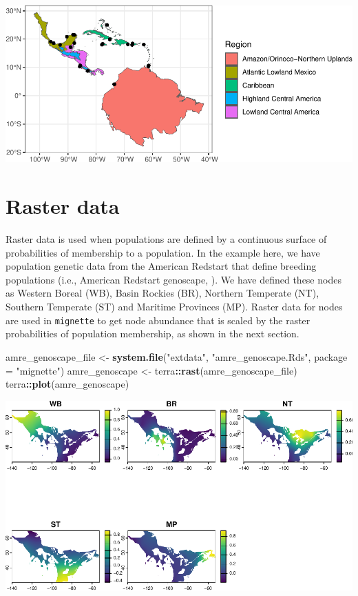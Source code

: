 \documentclass[
]{book}
\newenvironment{Shaded}{\begin{snugshade}}{\end{snugshade}}
\newcommand{\AttributeTok}[1]{\textcolor[rgb]{0.13,0.29,0.53}{#1}}
\newcommand{\FunctionTok}[1]{\textcolor[rgb]{0.13,0.29,0.53}{\textbf{#1}}}
\newcommand{\NormalTok}[1]{#1}
\newcommand{\OtherTok}[1]{\textcolor[rgb]{0.56,0.35,0.01}{#1}}
\newcommand{\SpecialCharTok}[1]{\textcolor[rgb]{0.81,0.36,0.00}{\textbf{#1}}}
\newcommand{\StringTok}[1]{\textcolor[rgb]{0.31,0.60,0.02}{#1}}
\begin{document}
\includegraphics{Mignette_files/figure-latex/unnamed-chunk-14-1.pdf}

\hypertarget{raster-data}{%
\section{Raster data}\label{raster-data}}

Raster data is used when populations are defined by a continuous surface of probabilities of membership to a population. In the example here, we have population genetic data from the American Redstart that define breeding populations (i.e., American Redstart genoscape, \citep{desaix2023low}). We have defined these nodes as Western Boreal (WB), Basin Rockies (BR), Northern Temperate (NT), Southern Temperate (ST) and Maritime Provinces (MP). Raster data for nodes are used in \texttt{mignette} to get node abundance that is scaled by the raster probabilities of population membership, as shown in the next section.

\begin{Shaded}
\begin{Highlighting}[]
\NormalTok{amre\_genoscape\_file }\OtherTok{\textless{}{-}} \FunctionTok{system.file}\NormalTok{(}\StringTok{"extdata"}\NormalTok{, }\StringTok{"amre\_genoscape.Rds"}\NormalTok{, }\AttributeTok{package =} \StringTok{"mignette"}\NormalTok{)}
\NormalTok{amre\_genoscape }\OtherTok{\textless{}{-}}\NormalTok{ terra}\SpecialCharTok{::}\FunctionTok{rast}\NormalTok{(amre\_genoscape\_file)}
\NormalTok{terra}\SpecialCharTok{::}\FunctionTok{plot}\NormalTok{(amre\_genoscape)}
\end{Highlighting}
\end{Shaded}

\includegraphics{Mignette_files/figure-latex/unnamed-chunk-15-1.pdf}
\end{document}
